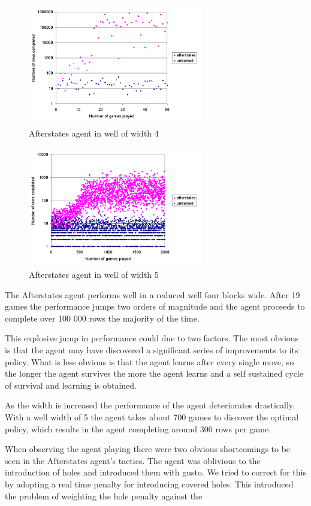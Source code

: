 \documentclass{rucsthesis}
\begin{document}
\begin{figure}[h]
\centering
\includegraphics[width=3in]{afterstatesredtet4well.png}
\caption{Afterstates agent in well of width 4}
\label{fig:afterstatesredtet4well}
\end{figure}

\begin{figure}[h]
\centering
\includegraphics[width=3in]{afterstatesredtet5well.png}
\caption{Afterstates agent in well of width 5}
\label{fig:afterstatesredtet5well}
\end{figure}

The Afterstates agent performs well in a reduced well four blocks wide. After 19 games the performance jumps two orders of magnitude and the agent proceeds to complete over 100 000 rows the majority of the time. 

This explosive jump in performance could due to two factors. The most obvious is that the agent may have discovered a significant series of improvements to its policy. What is less obvious is that the agent learns after every single move, so the longer the agent survives the more the agent learns and a self sustained cycle of survival and learning is obtained.

As the width is increased the performance of the agent deteriorates drastically. With a well width of 5 the agent takes about 700 games to discover the optimal policy, which results in the agent completing around 300 rows per game.

When observing the agent playing there were two obvious shortcomings to be seen in the Afterstates agent's tactics. The agent was oblivious to the introduction of holes and introduced them with gusto. We tried to correct for this by adopting a real time penalty for introducing covered holes. This introduced the problem of weighting the hole penalty against the
\end{document}
